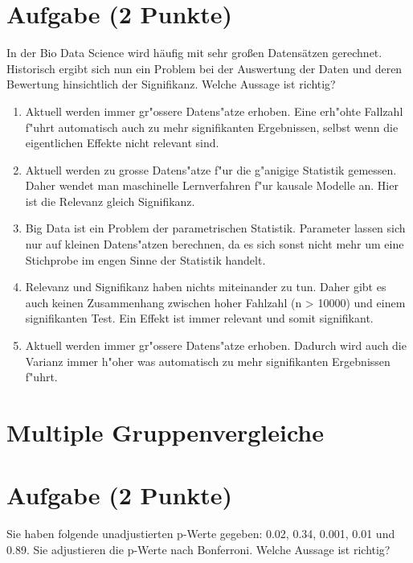 \documentclass[a4paper, 9pt]{scrartcl}\usepackage[]{graphicx}\usepackage[]{xcolor}
\begin{document}
\section{Aufgabe \hfill (2 Punkte)}

In der Bio Data Science wird h{\"a}ufig mit sehr gro{\ss}en Datens{\"a}tzen
gerechnet. Historisch ergibt sich nun ein Problem bei der Auswertung der
Daten und deren Bewertung hinsichtlich der Signifikanz. Welche Aussage ist richtig?



\begin{enumerate}
\item [\textbf{A} \msquare] Aktuell werden immer gr{"o}ssere Datens{"a}tze erhoben. Eine erh{"o}hte Fallzahl f{"u}hrt automatisch auch zu mehr signifikanten Ergebnissen, selbst wenn die eigentlichen Effekte nicht relevant sind.
\item [\textbf{B} \msquare] Aktuell werden zu grosse Datens{"a}tze f{"u}r die g{"a}nigige Statistik gemessen. Daher wendet man maschinelle Lernverfahren f{"u}r kausale Modelle an. Hier ist die Relevanz gleich Signifikanz.
\item [\textbf{C} \msquare] Big Data ist ein Problem der parametrischen Statistik. Parameter lassen sich nur auf kleinen Datens{"a}tzen berechnen, da es sich sonst nicht mehr um eine Stichprobe im engen Sinne der Statistik handelt.
\item [\textbf{D} \msquare] Relevanz und Signifikanz haben nichts miteinander zu tun. Daher gibt es auch keinen Zusammenhang zwischen hoher Fahlzahl (n > 10000) und einem signifikanten Test. Ein Effekt ist immer relevant und somit signifikant.
\item [\textbf{E} \msquare] Aktuell werden immer gr{"o}ssere Datens{"a}tze erhoben. Dadurch wird auch die Varianz immer h{"o}her was automatisch zu mehr signifikanten Ergebnissen f{"u}hrt.
\end{enumerate}
\section*{Multiple Gruppenvergleiche}    

\section{Aufgabe \hfill (2 Punkte)}



Sie haben folgende unadjustierten p-Werte gegeben: 0.02, 0.34, 0.001, 0.01 und 0.89. Sie adjustieren die p-Werte nach
Bonferroni. Welche Aussage ist richtig?
\end{document}
